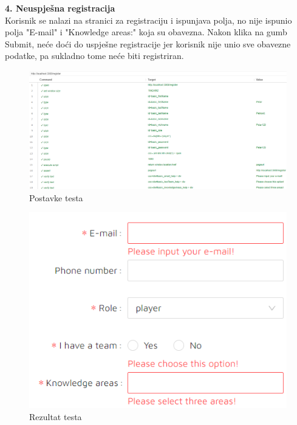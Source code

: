 			\eject

			\textbf{4. Neuspješna registracija}\\
				
				Korisnik se nalazi na stranici za registraciju i ispunjava polja, no nije ispunio polja "E-mail" i "Knowledge areas:" koja su obavezna. Nakon klika na gumb Submit, neće doći do uspješne registracije jer korisnik nije unio sve obavezne podatke, pa sukladno tome neće biti registriran.

				\begin{figure}[H]
					\includegraphics[width=\textwidth]{slike/NeuspjesnaRegistracija1.PNG} 
					\caption{Postavke testa}
					\label{fig:NeuspjesnaRegistracija1}
				\end{figure}

				\begin{figure}[H]
					\includegraphics[width=\textwidth]{slike/NeuspjesnaRegistracija2.PNG} 
					\caption{Rezultat testa}
					\label{fig:NeuspjesnaRegistracija2}
				\end{figure}
				
